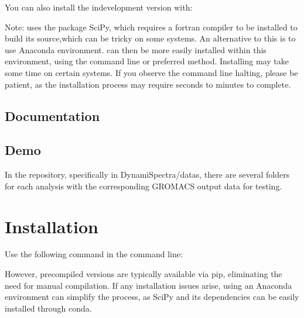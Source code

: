 \documentclass[a4paper,10pt,english]{sphinxmanual}
\begin{document}
\sphinxAtStartPar
You can also install the in\sphinxhyphen{}development version with:

\begin{sphinxVerbatim}[commandchars=\\\{\}]
  
\end{sphinxVerbatim}

\sphinxAtStartPar
Note:  uses the package SciPy, which requires a fortran compiler to be installed to build its source,which can be tricky on some systems. An alternative to this is to use Anaconda environment.  can then be more easily installed within this environment, using the command line or preferred method. Installing  may take some time on certain systems. If you observe the command line halting, please be patient, as the installation process may require seconds to minutes to complete.


\section{Documentation}
\label{\detokenize{Overview:documentation}}
\sphinxAtStartPar
{}


\section{Demo}
\label{\detokenize{Overview:demo}}
\sphinxAtStartPar
In the repository, specifically in DynamiSpectra/datas, there are several folders for each analysis with the corresponding GROMACS output data for testing.

\sphinxstepscope


\chapter{Installation}
\label{\detokenize{Installation:installation}}\label{\detokenize{Installation::doc}}
\sphinxAtStartPar
Use the following command in the command line:

\begin{sphinxVerbatim}[commandchars=\\\{\}]
  
\end{sphinxVerbatim}
\begin{description}
\sphinxAtStartPar
However, pre\sphinxhyphen{}compiled versions are typically available via pip, eliminating the need for manual compilation. If any installation issues arise, using an Anaconda environment can simplify the process, as SciPy and its dependencies can be easily installed through conda.

\end{description}
\end{document}
